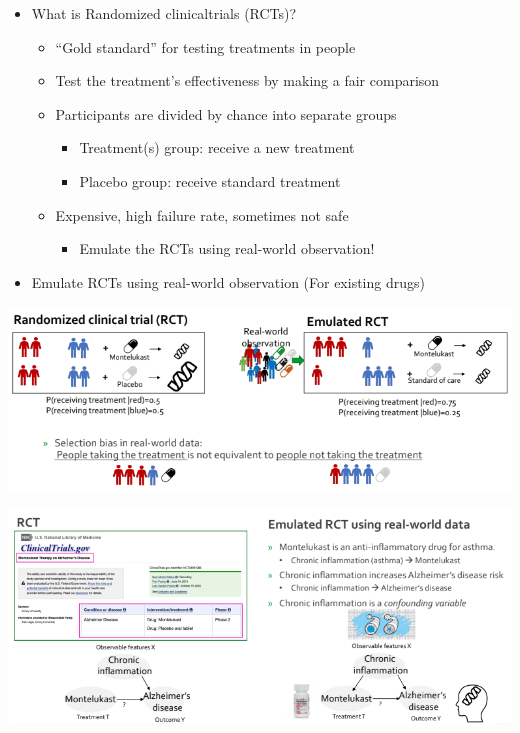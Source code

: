 \documentclass[
]{book}
\providecommand{\tightlist}{%
  \setlength{\itemsep}{0pt}\setlength{\parskip}{0pt}}
\theoremstyle{definition}
\theoremstyle{definition}
\theoremstyle{definition}
\theoremstyle{definition}
\theoremstyle{remark}
\begin{document}
\begin{itemize}
\tightlist
\item
  What is Randomized clinicaltrials (RCTs)?

  \begin{itemize}
  \tightlist
  \item
    ``Gold standard'' for testing treatments in people
  \item
    Test the treatment's effectiveness by making a fair
    comparison
  \item
    Participants are divided by chance into separate groups

    \begin{itemize}
    \tightlist
    \item
      Treatment(s) group: receive a new treatment
    \item
      Placebo group: receive standard treatment
    \end{itemize}
  \item
    Expensive, high failure rate, sometimes not safe

    \begin{itemize}
    \tightlist
    \item
      Emulate the RCTs using real-world observation!
    \end{itemize}
  \end{itemize}
\item
  Emulate RCTs using real-world observation (For existing drugs)
\end{itemize}

\includegraphics{figures/05.png}

\includegraphics{figures/06.png}
\end{document}
